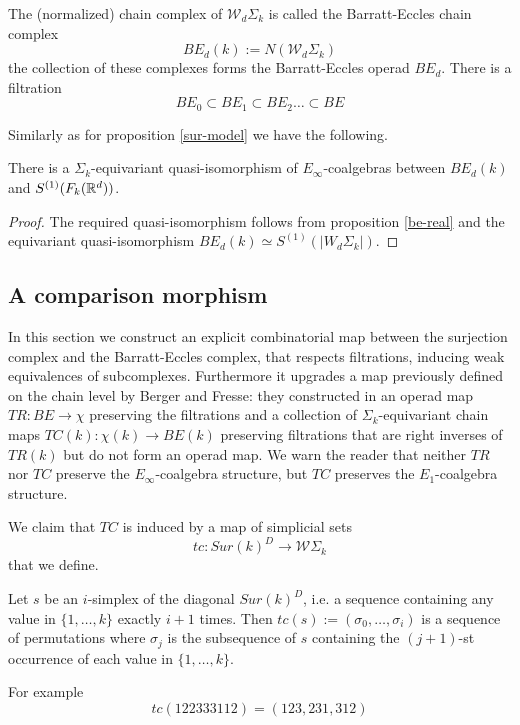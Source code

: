 The (normalized) chain complex of $\mathcal{W}_d\Sigma_k$ is called the Barratt-Eccles chain complex $$BE_d(k):=N(\mathcal{W}_d\Sigma_k)$$
the collection of these complexes forms the Barratt-Eccles operad $BE_d$. \cite{BF}
There is a filtration 
$$BE_0 \subset BE_1 \subset BE_2 \dots \subset BE$$

Similarly as for proposition \ref{sur-model} we have the following.
\begin{proposition}
There is a  $\Sigma_k$-equivariant quasi-isomorphism
of $E_\infty$-coalgebras between $BE_d(k)$ and
$S^{(1)}(F_k(\mathbb{R}^d))$.
\end{proposition}

\begin{proof} \label{be-model}
The required quasi-isomorphism follows from proposition \ref{be-real} and the equivariant quasi-isomorphism $BE_d(k) \simeq S^{(1)}(|W_d\Sigma_k|)$.  %
\end{proof}


\subsection{A comparison morphism}

In this section we construct an explicit combinatorial map between the surjection complex and the Barratt-Eccles complex, that respects filtrations, inducing weak equivalences of subcomplexes. Furthermore it upgrades a map previously defined on the chain level by Berger and Fresse: they constructed in \cite{BFsmall}
  an operad map $TR:BE \to \chi$ preserving the filtrations and a collection of $\Sigma_k$-equivariant
chain maps $TC(k):\chi(k) \to BE(k)$ preserving filtrations
that are right inverses of $TR(k)$ but do not form an operad map. We warn the reader that neither $TR$ nor $TC$ preserve the $E_\infty$-coalgebra structure, but 
$TC$ preserves the $E_1$-coalgebra structure.

We claim that $TC$ is induced by a map of simplicial sets
$$tc: Sur(k)^D \to \mathcal{W}\Sigma_k$$ that we define.
\begin{definition}
Let $s$ be an $i$-simplex  of the diagonal $Sur(k)^D$, i.e. a sequence containing any value in $\{1,\dots,k\}$ exactly $i+1$ times.
Then $tc(s):=(\sigma_0,\dots,\sigma_i)$ is a sequence of permutations where $\sigma_j$ is the subsequence of $s$ containing the $(j+1)$-st occurrence of each value in $\{1,\dots,k\}$.
 \end{definition}

 For example
 $$tc(122333112)=(123,231,312)$$

